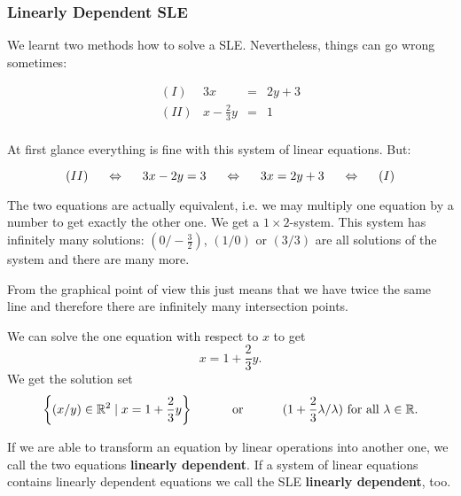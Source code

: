 \subsubsection{Linearly Dependent SLE}

We learnt two methods how to solve a SLE. Nevertheless, things can go wrong sometimes:

\[
\begin{array}{lrcl}
(I)&3x&=&2y+3\\
(II)&x-\frac{2}{3}y&=&1\\
\end{array}
\]

At first glance everything is fine with this system of linear equations. But:

\[
(II) \hspace{5mm}\Leftrightarrow\hspace{5mm} 3x-2y=3 \hspace{5mm}\Leftrightarrow\hspace{5mm} 3x=2y+3 \hspace{5mm}\Leftrightarrow\hspace{5mm} (I)
\]

The two equations are actually equivalent, i.e. we may multiply one equation by a number to get exactly the other one. We get a $1\times 2$-system. This system has infinitely many solutions: $\left(0/-\frac{3}{2}\right)$, $(1/0)$ or $(3/3)$ are all solutions of the system and there are many more.
\vsp

From the graphical point of view this just means that we have twice the same line and therefore there are infinitely many intersection points.
\vsp

We can solve the one equation with respect to $x$ to get
\[
x=1+\frac{2}{3}y.
\]
We get the solution set
\[
\left\{(x/y) \in \R^2 \mid x=1+\frac{2}{3}y\right\} \hsp\hsp\text{ or } \hsp\hsp (1+\frac{2}{3}\lambda / \lambda) \text{ for all } \lambda \in \R.
\]

\begin{tcolorbox}[colback=white]\begin{definition}
If we are able to transform an equation by linear operations into another one, we call the two equations \textbf{linearly dependent}. If a system of linear equations contains linearly dependent equations we call the SLE \textbf{linearly dependent}, too.
\end{definition}
\end{tcolorbox}
\vsp

